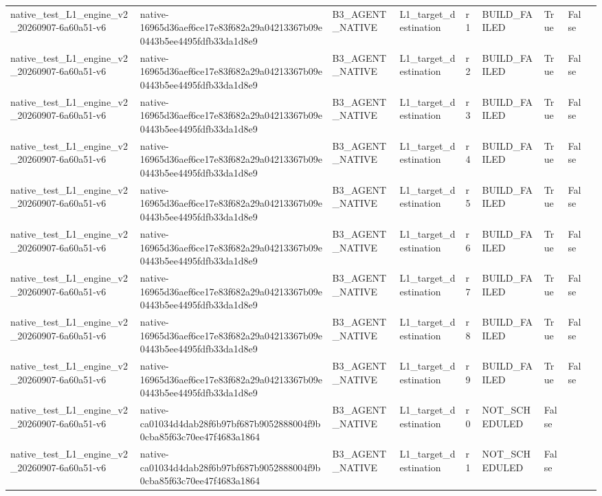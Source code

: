 \begin{tabular}{lllllllll}
native\_test\_L1\_engine\_v2\_20260907-6a60a51-v6 & native-16965d36aef6ce17e83f682a29a04213367b09e0443b5ee4495fdfb33da1d8e9 & B3\_AGENT\_NATIVE & L1\_target\_destination & r1 & BUILD\_FAILED & True & False &  \\
native\_test\_L1\_engine\_v2\_20260907-6a60a51-v6 & native-16965d36aef6ce17e83f682a29a04213367b09e0443b5ee4495fdfb33da1d8e9 & B3\_AGENT\_NATIVE & L1\_target\_destination & r2 & BUILD\_FAILED & True & False &  \\
native\_test\_L1\_engine\_v2\_20260907-6a60a51-v6 & native-16965d36aef6ce17e83f682a29a04213367b09e0443b5ee4495fdfb33da1d8e9 & B3\_AGENT\_NATIVE & L1\_target\_destination & r3 & BUILD\_FAILED & True & False &  \\
native\_test\_L1\_engine\_v2\_20260907-6a60a51-v6 & native-16965d36aef6ce17e83f682a29a04213367b09e0443b5ee4495fdfb33da1d8e9 & B3\_AGENT\_NATIVE & L1\_target\_destination & r4 & BUILD\_FAILED & True & False &  \\
native\_test\_L1\_engine\_v2\_20260907-6a60a51-v6 & native-16965d36aef6ce17e83f682a29a04213367b09e0443b5ee4495fdfb33da1d8e9 & B3\_AGENT\_NATIVE & L1\_target\_destination & r5 & BUILD\_FAILED & True & False &  \\
native\_test\_L1\_engine\_v2\_20260907-6a60a51-v6 & native-16965d36aef6ce17e83f682a29a04213367b09e0443b5ee4495fdfb33da1d8e9 & B3\_AGENT\_NATIVE & L1\_target\_destination & r6 & BUILD\_FAILED & True & False &  \\
native\_test\_L1\_engine\_v2\_20260907-6a60a51-v6 & native-16965d36aef6ce17e83f682a29a04213367b09e0443b5ee4495fdfb33da1d8e9 & B3\_AGENT\_NATIVE & L1\_target\_destination & r7 & BUILD\_FAILED & True & False &  \\
native\_test\_L1\_engine\_v2\_20260907-6a60a51-v6 & native-16965d36aef6ce17e83f682a29a04213367b09e0443b5ee4495fdfb33da1d8e9 & B3\_AGENT\_NATIVE & L1\_target\_destination & r8 & BUILD\_FAILED & True & False &  \\
native\_test\_L1\_engine\_v2\_20260907-6a60a51-v6 & native-16965d36aef6ce17e83f682a29a04213367b09e0443b5ee4495fdfb33da1d8e9 & B3\_AGENT\_NATIVE & L1\_target\_destination & r9 & BUILD\_FAILED & True & False &  \\
native\_test\_L1\_engine\_v2\_20260907-6a60a51-v6 & native-ca01034d4dab28f6b97bf687b9052888004f9b0cba85f63c70ee47f4683a1864 & B3\_AGENT\_NATIVE & L1\_target\_destination & r0 & NOT\_SCHEDULED & False &  &  \\
native\_test\_L1\_engine\_v2\_20260907-6a60a51-v6 & native-ca01034d4dab28f6b97bf687b9052888004f9b0cba85f63c70ee47f4683a1864 & B3\_AGENT\_NATIVE & L1\_target\_destination & r1 & NOT\_SCHEDULED & False &  &  \\

\end{tabular}
